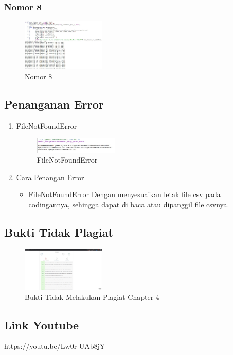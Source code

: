 \subsubsection{Nomor 8}
\hfill\break

\begin{figure}[H]
\centering
\includegraphics[width=4cm]{figures/1174066/4/no8.jpg}
\caption{Nomor 8}
\end{figure}

\subsection{Penanganan Error}
\begin{enumerate}
	\item FileNotFoundError
	\begin{figure}[H]
		\includegraphics[width=4cm]{figures/1174066/4/error1.jpg}
		\centering
		\caption{FileNotFoundError}
	\end{figure}
	\item Cara Penangan Error
	\begin{itemize}
		\item FileNotFoundError
		\hfill\break
		Dengan menyesuaikan letak file csv pada codingannya, sehingga dapat  di baca atau dipanggil file csvnya.
	\end{itemize}
\end{enumerate}

\subsection{Bukti Tidak Plagiat}
\begin{figure}[H]
\centering
	\includegraphics[width=4cm]{figures/1174066/4/plagiat.jpg}
	\caption{Bukti Tidak Melakukan Plagiat Chapter 4}
\end{figure}

\subsection{Link Youtube}
https://youtu.be/Lw0r-UAb8jY
